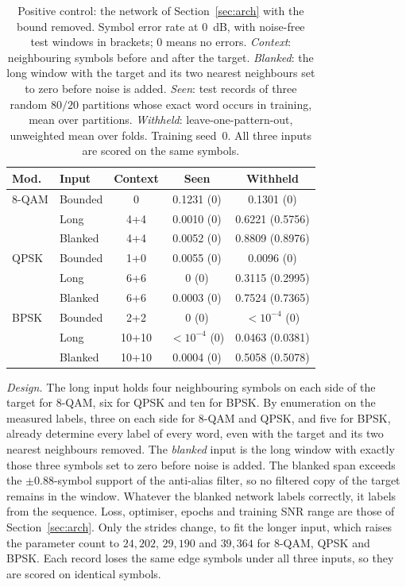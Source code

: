 \documentclass{ieeeaccess}
\begin{document}
\begin{table}[!t]
\caption{Positive control: the network of Section~\ref{sec:arch} with the
bound removed. Symbol error rate at $0$~dB, with noise-free test windows in
brackets; 0 means no errors. \emph{Context}: neighbouring symbols before and
after the target. \emph{Blanked}: the long window with the target and its two
nearest neighbours set to zero before noise is added. \emph{Seen}: test records
of three random $80/20$ partitions whose exact word occurs in training, mean
over partitions. \emph{Withheld}: leave-one-pattern-out, unweighted mean over
folds. Training seed~0. All three inputs are scored on the same symbols.}
\label{tab:positive}
\centering
\footnotesize
\setlength{\tabcolsep}{3pt}
\begin{tabular}{llccc}
\toprule
Mod. & Input & Context & Seen & Withheld \\
\midrule
8-QAM & Bounded & 0     & 0.1231 (0) & 0.1301 (0) \\
      & Long    & 4+4   & 0.0010 (0) & 0.6221 (0.5756) \\
      & Blanked & 4+4   & 0.0052 (0) & 0.8809 (0.8976) \\
\addlinespace
QPSK  & Bounded & 1+0   & 0.0055 (0) & 0.0096 (0) \\
      & Long    & 6+6   & 0 (0)      & 0.3115 (0.2995) \\
      & Blanked & 6+6   & 0.0003 (0) & 0.7524 (0.7365) \\
\addlinespace
BPSK  & Bounded & 2+2   & 0 (0)      & $<\!10^{-4}$ (0) \\
      & Long    & 10+10 & $<\!10^{-4}$ (0) & 0.0463 (0.0381) \\
      & Blanked & 10+10 & 0.0004 (0) & 0.5058 (0.5078) \\
\bottomrule
\end{tabular}
\end{table}

\emph{Design.} The long input holds four neighbouring symbols on each side of
the target for 8-QAM, six for QPSK and ten for BPSK. By enumeration on the
measured labels, three on each side for 8-QAM and QPSK, and five for BPSK,
already determine every label of every word, even with the target and its two
nearest neighbours removed. The \emph{blanked} input is the long window with
exactly those three symbols set to zero before noise is added. The blanked span
exceeds the $\pm 0.88$-symbol support of the anti-alias filter, so no filtered
copy of the target remains in the window. Whatever the blanked network labels
correctly, it labels from the sequence. Loss, optimiser, epochs and training
SNR range are those of Section~\ref{sec:arch}. Only the strides change, to fit
the longer input, which raises the parameter count to $24{,}202$, $29{,}190$
and $39{,}364$ for 8-QAM, QPSK and BPSK. Each record loses the same edge
symbols under all three inputs, so they are scored on identical symbols.
\end{document}
